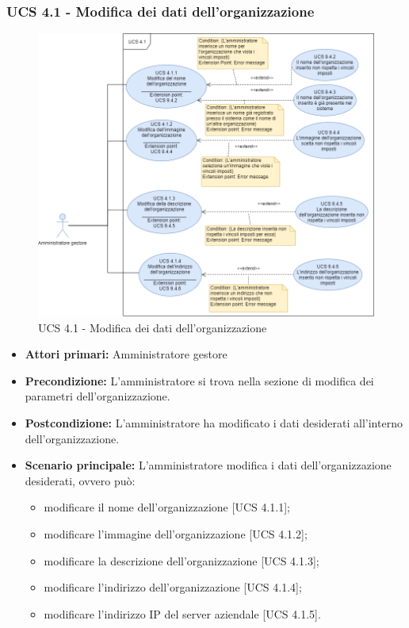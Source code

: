 \subsubsection{UCS 4.1 - Modifica dei dati dell'organizzazione}%
\begin{figure}[h]
	\centering
    \includegraphics[scale=0.53]{sezioni/UseCase/Immagini/UCS4.1.png}
    \caption{UCS 4.1 - Modifica dei dati dell'organizzazione}
\end{figure}
\begin{itemize}
    \item \textbf{Attori primari:} Amministratore gestore
    \item \textbf{Precondizione:} L'amministratore si trova nella sezione di modifica dei parametri dell'organizzazione.
    \item \textbf{Postcondizione:} L'amministratore ha modificato i dati desiderati all'interno dell'organizzazione.
    \item \textbf{Scenario principale:} L'amministratore modifica i dati dell'organizzazione desiderati, ovvero può:
    \begin{itemize}
        \item modificare il nome dell'organizzazione [UCS 4.1.1];
        \item modificare l'immagine dell'organizzazione [UCS 4.1.2];
        \item modificare la descrizione dell'organizzazione [UCS 4.1.3];
        \item modificare l'indirizzo dell'organizzazione [UCS 4.1.4];
        \item modificare l'indirizzo IP del server aziendale [UCS 4.1.5].
    \end{itemize}
\end{itemize}

